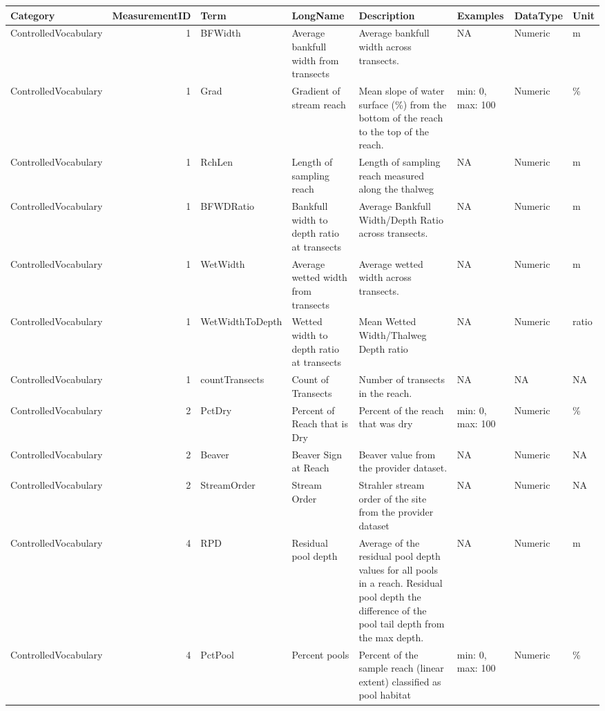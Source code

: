 \documentclass[
]{article}
\begin{document}
\begin{table}
\centering
\begin{tabular}[t]{l|r|l|l|l|l|l|l}
\hline
Category & MeasurementID & Term & LongName & Description & Examples & DataType & Unit\\
\hline
ControlledVocabulary & 1 & BFWidth & Average bankfull width from transects & Average bankfull width across transects. & NA & Numeric & m\\
\hline
ControlledVocabulary & 1 & Grad & Gradient of stream reach & Mean slope of water surface (\%) from the bottom of the reach to the top of the reach. & min: 0, max: 100 & Numeric & \%\\
\hline
ControlledVocabulary & 1 & RchLen & Length of sampling reach & Length of sampling reach measured along the thalweg & NA & Numeric & m\\
\hline
ControlledVocabulary & 1 & BFWDRatio & Bankfull width to depth ratio at transects & Average Bankfull Width/Depth Ratio across transects. & NA & Numeric & m\\
\hline
ControlledVocabulary & 1 & WetWidth & Average wetted width from transects & Average wetted width across transects. & NA & Numeric & m\\
\hline
ControlledVocabulary & 1 & WetWidthToDepth & Wetted width to depth ratio at transects & Mean Wetted Width/Thalweg Depth ratio & NA & Numeric & ratio\\
\hline
ControlledVocabulary & 1 & countTransects & Count of Transects & Number of transects in the reach. & NA & NA & NA\\
\hline
ControlledVocabulary & 2 & PctDry & Percent of Reach that is Dry & Percent of the reach that was dry & min: 0, max: 100 & Numeric & \%\\
\hline
ControlledVocabulary & 2 & Beaver & Beaver Sign at Reach & Beaver value from the provider dataset. & NA & Numeric & NA\\
\hline
ControlledVocabulary & 2 & StreamOrder & Stream Order & Strahler stream order of the site from the provider dataset & NA & Numeric & NA\\
\hline
ControlledVocabulary & 4 & RPD & Residual pool depth & Average of the residual pool depth values for all pools in a reach. Residual pool depth the difference of the pool tail depth from the max depth. & NA & Numeric & m\\
\hline
ControlledVocabulary & 4 & PctPool & Percent pools & Percent of the sample reach (linear extent) classified as pool habitat & min: 0, max: 100 & Numeric & \%\\

\end{tabular}
\end{table}
\end{document}
